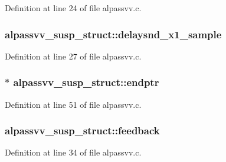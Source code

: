 Definition at line 24 of file alpassvv.\+c.

\subsubsection[{\texorpdfstring{delaysnd\+\_\+x1\+\_\+sample}{delaysnd_x1_sample}}]{ alpassvv\+\_\+susp\+\_\+struct\+::delaysnd\+\_\+x1\+\_\+sample}\hypertarget{structalpassvv__susp__struct_a27b3273dcbdf0f9a96759327588efdf9}{}\label{structalpassvv__susp__struct_a27b3273dcbdf0f9a96759327588efdf9}


Definition at line 27 of file alpassvv.\+c.

\subsubsection[{\texorpdfstring{endptr}{endptr}}]{$\ast$ alpassvv\+\_\+susp\+\_\+struct\+::endptr}\hypertarget{structalpassvv__susp__struct_a742e4b79a74150b4b998e09c8785cc97}{}\label{structalpassvv__susp__struct_a742e4b79a74150b4b998e09c8785cc97}


Definition at line 51 of file alpassvv.\+c.

\subsubsection[{\texorpdfstring{feedback}{feedback}}]{ alpassvv\+\_\+susp\+\_\+struct\+::feedback}\hypertarget{structalpassvv__susp__struct_a5e035cd86b0c9f824a443c855b31b5fc}{}\label{structalpassvv__susp__struct_a5e035cd86b0c9f824a443c855b31b5fc}


Definition at line 34 of file alpassvv.\+c.

